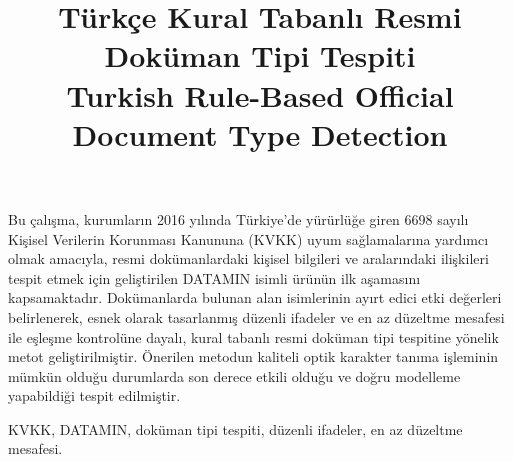 \documentclass[conference, a4paper]{IEEEtran}
\begin{document}

\title{Türkçe Kural Tabanlı Resmi Doküman Tipi Tespiti\\Turkish Rule-Based Official Document Type Detection}

\author{

    \and
}

\maketitle

\begin{ozet}
    Bu çalışma, kurumların 2016 yılında Türkiye’de yürürlüğe giren 6698 sayılı Kişisel Verilerin Korunması Kanununa
    (KVKK) uyum sağlamalarına yardımcı olmak amacıyla, resmi dokümanlardaki kişisel bilgileri ve aralarındaki
    ilişkileri tespit etmek için geliştirilen DATAMIN isimli ürünün ilk aşamasını kapsamaktadır. Dokümanlarda bulunan
    alan isimlerinin ayırt edici etki değerleri belirlenerek, esnek olarak tasarlanmış düzenli ifadeler ve en az
    düzeltme mesafesi ile eşleşme kontrolüne dayalı, kural tabanlı resmi doküman tipi tespitine yönelik metot
    geliştirilmiştir. Önerilen metodun kaliteli optik karakter tanıma işleminin mümkün olduğu durumlarda son derece
    etkili olduğu ve doğru modelleme yapabildiği tespit edilmiştir.
\end{ozet}

\begin{IEEEanahtar}
    KVKK, DATAMIN, doküman tipi tespiti, düzenli ifadeler, en az düzeltme mesafesi.
\end{IEEEanahtar}
\end{document}
